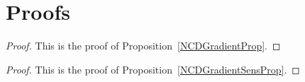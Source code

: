 \appendix

\section{Proofs}

\begin{proof}
    This is the proof of Proposition~\ref{NCDGradientProp}.  
\end{proof}

\begin{proof}
    This is the proof of Proposition~\ref{NCDGradientSensProp}.   
\end{proof}